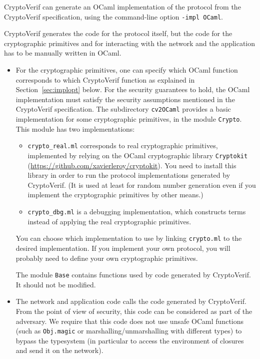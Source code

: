 CryptoVerif can generate an OCaml implementation of the protocol
from the CryptoVerif specification, using the command-line
option \texttt{-impl OCaml}.

CryptoVerif generates the code for the protocol itself, but the code
for the cryptographic primitives and for interacting with the network
and the application has to be manually written in OCaml. 
\begin{itemize}

\item For the cryptographic primitives, one can specify which OCaml 
function corresponds to which CryptoVerif function as explained in
Section~\ref{sec:implopt} below. For the security guarantees to hold, the OCaml
implementation must satisfy the security assumptions mentioned
in the CryptoVerif specification. The subdirectory \texttt{cv2OCaml}
provides a basic implementation for some cryptographic primitives,
in the module \texttt{Crypto}. This module has two implementations:
\begin{itemize}

\item \texttt{crypto\_real.ml} corresponds to real cryptographic primitives,
implemented by relying on the OCaml cryptographic library \texttt{Cryptokit}
(\url{https://github.com/xavierleroy/cryptokit}). You need to
install this library in order to run the protocol implementations
generated by CryptoVerif. (It is used at least for random number generation
even if you implement the cryptographic primitives by other means.)

\item \texttt{crypto\_dbg.ml} is a debugging implementation, which 
constructs terms instead of applying the real cryptographic primitives.

\end{itemize}
You can choose which implementation to use by linking \texttt{crypto.ml}
to the desired implementation. If you implement your own protocol,
you will probably need to define your own cryptographic primitives.

The module \texttt{Base} contains functions used by code
generated by CryptoVerif. It should not be modified.

\item The network and application code calls the code generated
by CryptoVerif. From the point of view of security, this code can
be considered as part of the adversary. We require that this code
does not use unsafe OCaml functions (such as \texttt{Obj.magic}
or marshalling/unmarshalling with different types) to bypass the
typesystem (in particular to access the environment of closures
and send it on the network).


\end{itemize}
